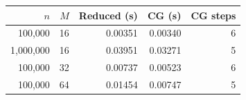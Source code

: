 \begin{tabular}{rrrrr}
\toprule
$n$ & $M$ & Reduced (s) & CG (s) & CG steps \\
\midrule
100,000 & 16 & 0.00351 & 0.00340 & 6 \\
1,000,000 & 16 & 0.03951 & 0.03271 & 5 \\
100,000 & 32 & 0.00737 & 0.00523 & 6 \\
100,000 & 64 & 0.01454 & 0.00747 & 5 \\
\bottomrule
\end{tabular}
